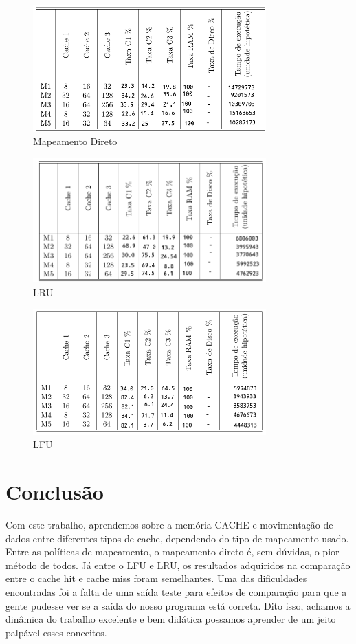 \documentclass{article}
\begin{document}
\begin{figure}
    \centering
    \includegraphics[width=0.8\textwidth]{mapeamento.png}
    \caption{Mapeamento Direto}
    \label{fig:Tabela 1}
\end{figure}

\begin{figure}
    \centering
    \includegraphics[width=0.8\textwidth]{lru.png}
    \caption{LRU}
    \label{fig:Tabela 2}
\end{figure}

\begin{figure}
    \centering
    \includegraphics[width=0.8\textwidth]{lfu.png}
    \caption{LFU}
    \label{fig:Tabela 3}
\end{figure}

\clearpage
\section{Conclusão}
Com este trabalho, aprendemos sobre a memória CACHE e movimentação de dados entre diferentes tipos de cache, dependendo do
tipo de mapeamento usado.
Entre as políticas de mapeamento, o mapeamento direto é, sem dúvidas, o pior método de todos. Já entre o LFU e LRU,
os resultados adquiridos na comparação entre o cache hit e cache miss foram semelhantes.
Uma das dificuldades encontradas foi a falta de uma saída teste para efeitos de comparação para que a gente pudesse ver 
se a saída do nosso programa está correta. Dito isso, achamos a dinâmica do trabalho excelente e bem didática possamos aprender de um jeito palpável esses conceitos.
\end{document}
